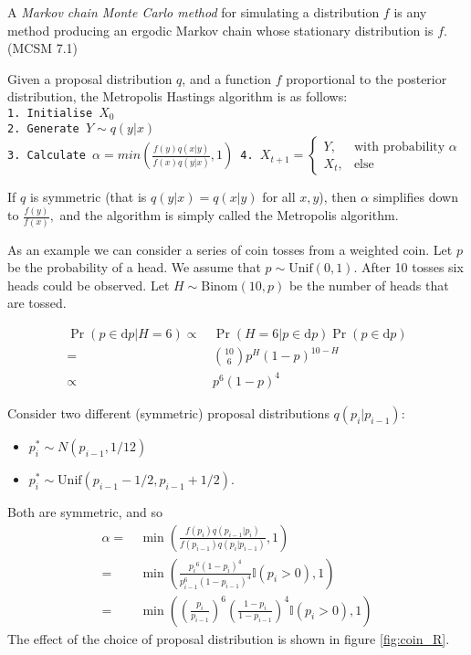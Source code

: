 \begin{definition}
    A \emph{Markov chain Monte Carlo method} for simulating a distribution $f$ is any method producing an ergodic Markov chain whose stationary distribution is $f$. (MCSM 7.1)
\end{definition}

Given a proposal distribution $q$, and a function $f$ proportional to the posterior distribution, the Metropolis Hastings algorithm is as follows: \texttt{\\
    1. Initialise $X_0$\\
    2. Generate $Y \sim q(y|x)$\\
    3. Calculate $\alpha =
        min\left(\frac{f(y)q(x|y)}{f(x)q(y|x)}, 1\right)$
    4. $X_{t+1} = \begin{cases} Y, & \text{with probability } \alpha\\ X_{t},& \text{else}\end{cases}$
}

If $q$ is symmetric (that is $q(y|x) = q(x|y)$ for all $x, y$), then $\alpha$ simplifies down to $\frac{f(y)}{f(x)},$ and the algorithm is simply called the Metropolis algorithm.

As an example we can consider a series of coin tosses from a weighted coin. Let $p$ be the probability of a head. We assume that $p\sim\mathrm{Unif}(0,1).$ After 10 tosses six heads could be observed. Let $H\sim\mathrm{Binom}(10, p)$ be the number of heads that are tossed.

\begin{align*}
    \Pr(p\in\mathrm{d}p| H= 6)\propto & \, \Pr(H= 6|p\in\mathrm{d}p)\Pr(p\in\mathrm{d}p) \\
    =                                 & \, \binom{10}{6} p^H(1 - p)^{10 - H}             \\
    \propto                           & \, p^6(1 - p)^{4}
\end{align*}

Consider two different (symmetric) proposal distributions $q(p_i|p_{i - 1})$: \begin{itemize}
    \item $p_i^* \sim N(p_{i - 1}, 1/12)$
    \item $p_i^* \sim \mathrm{Unif}(p_{i - 1} - 1/2, p_{i - 1} + 1/2)$.
\end{itemize} Both are symmetric, and so \begin{align*}
    \alpha = & \, \min\left(\frac{f(p_i)q(p_{i - 1}|p_{i})}{f(p_{i - 1})q(p_i|p_{i - 1})}, 1\right)                                         \\
    =        & \, \min\left(\frac{{p_i}^{6}(1 - p_i)^4}{p_{i - 1}^6(1 - p_{i - 1})^4}\mathbb{I}(p_i > 0), 1\right)                          \\
    =        & \, \min\left(\left(\frac{p_i}{p_{i - 1}}\right)^{6}\left(\frac{1 - p_i}{1 - p_{i - 1}}\right)^4\mathbb{I}(p_i > 0), 1\right)
\end{align*} The effect of the choice of proposal distribution is shown in figure \ref{fig:coin_R}.


